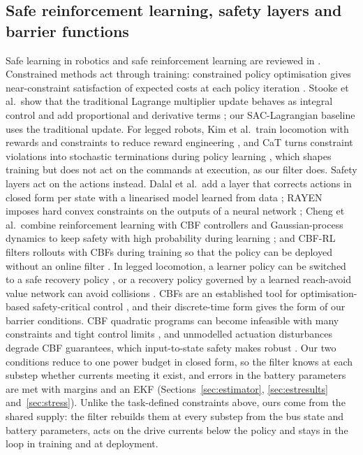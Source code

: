 \subsection{Safe reinforcement learning, safety layers and barrier functions}\label{sec:rw-safe}
Safe learning in robotics and safe reinforcement learning are reviewed in \cite{brunke2022safe,gu2024review}. Constrained methods act through training: constrained policy optimisation gives near-constraint satisfaction of expected costs at each policy iteration \cite{achiam2017cpo}. Stooke et al.\ show that the traditional Lagrange multiplier update behaves as integral control and add proportional and derivative terms \cite{stooke2020pid}; our SAC-Lagrangian baseline uses the traditional update. For legged robots, Kim et al.\ train locomotion with rewards and constraints to reduce reward engineering \cite{kim2024constraints}, and CaT turns constraint violations into stochastic terminations during policy learning \cite{chanesane2024cat}, which shapes training but does not act on the commands at execution, as our filter does. Safety layers act on the actions instead. Dalal et al.\ add a layer that corrects actions in closed form per state with a linearised model learned from data \cite{dalal2018safety}; RAYEN imposes hard convex constraints on the outputs of a neural network \cite{tordesillas2023rayen}; Cheng et al.\ combine reinforcement learning with CBF controllers and Gaussian-process dynamics to keep safety with high probability during learning \cite{cheng2019endtoend}; and CBF-RL filters rollouts with CBFs during training so that the policy can be deployed without an online filter \cite{yang2026cbfrl}. In legged locomotion, a learner policy can be switched to a safe recovery policy \cite{yang2022saferl}, or a recovery policy governed by a learned reach-avoid value network can avoid collisions \cite{he2024abs}. CBFs are an established tool for optimisation-based safety-critical control \cite{ames2019cbf}, and their discrete-time form \cite{agrawal2017dcbf} gives the form of our barrier conditions. CBF quadratic programs can become infeasible with many constraints and tight control limits \cite{xiao2022hocbf}, and unmodelled actuation disturbances degrade CBF guarantees, which input-to-state safety makes robust \cite{alan2023issf}. Our two conditions reduce to one power budget in closed form, so the filter knows at each substep whether currents meeting it exist, and errors in the battery parameters are met with margins and an EKF (Sections~\ref{sec:estimator}, \ref{sec:estresults} and~\ref{sec:stress}). Unlike the task-defined constraints above, ours come from the shared supply: the filter rebuilds them at every substep from the bus state and battery parameters, acts on the drive currents below the policy and stays in the loop in training and at deployment.

